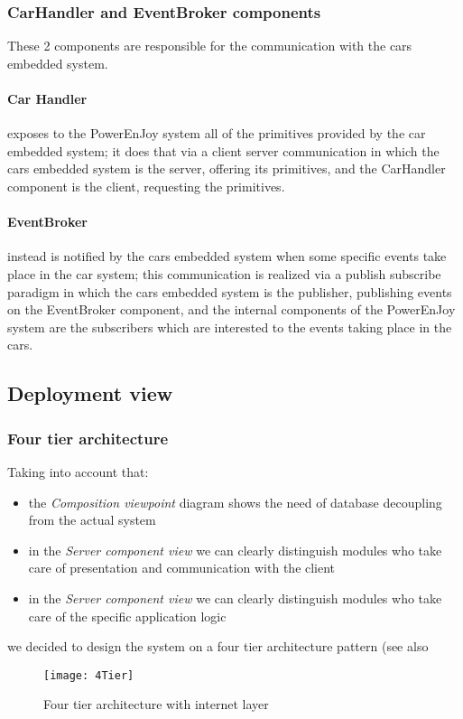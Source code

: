 \subsubsection{CarHandler and EventBroker components}
These 2 components are responsible for the communication with the cars embedded system.
\paragraph{Car Handler} exposes to the PowerEnJoy system all of the primitives provided by the car embedded system; it does that via a client server communication in which the cars embedded system is the server, offering its primitives, and the CarHandler component is the client, requesting the primitives.
\paragraph{EventBroker} instead is notified by the cars embedded system when some specific events take place in the car system; this communication is realized via a publish subscribe paradigm in which the cars embedded system is the publisher, publishing events on the EventBroker component, and the internal components of the PowerEnJoy system are the subscribers which are interested to the events taking place in the cars. 
\clearpage

\subsection{Deployment view}

\subsubsection{Four tier architecture}
Taking into account that:
\begin{itemize}
	\item the \emph{Composition viewpoint} diagram shows the need of database decoupling from the actual system
	\item in the \emph{Server component view} we can clearly distinguish modules who take care of presentation and communication with the client
	\item in the \emph{Server component view} we can clearly distinguish modules who take care of the specific application logic
\end{itemize}
we decided to design the system on a four tier architecture pattern (see also \label{sec:deploymentView}
\begin{figure}[h!]
	\centering
	\texttt{[image: 4Tier]}
	\caption{
		\label{fig:fourTierCloud} 
		Four tier architecture with internet layer
	}
\end{figure}

